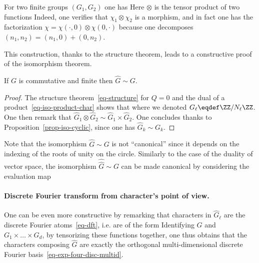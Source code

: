 For two finite groups $(G_1,G_2)$ one has 
Here $\otimes$ is the tensor product of two functions
Indeed, one verifies that $\chi_1 \otimes \chi_2$ is a morphism, and in fact one has the factorization $\chi=\chi(\cdot,0) \otimes \chi(0,\cdot)$ because one decomposes $(n_1,n_2)=(n_1,0)+(0,n_2)$. 

This construction, thanks to the structure theorem, leads to a constructive proof of the isomorphism theorem.

\begin{prop}
	If $G$ is commutative and finite then $\hat G \sim G$.
\end{prop}
\begin{proof}
	The structure theorem~\eqref{eq-structure} for $Q=0$ and the dual of a product~\eqref{eq-iso-product-char} shows that 
	where we denoted $G_\ell \eqdef \ZZ/N_\ell\ZZ$. 
	One then remark that  $\hat G_1 \otimes \hat G_2 \sim \hat G_1 \times \hat G_2$.
	One concludes thanks to Proposition~\ref{prop-iso-cyclic}, since one has $\hat G_k \sim G_k$.
\end{proof}

Note that the isomorphism $\hat G \sim G$ is not ``canonical'' since it depends on the indexing of the roots of unity on the circle. Similarly to the case of the duality of vector space, the isomorphism $\hat{\hat{G}} \sim G$ can be made canonical by considering the evaluation map

\paragraph{Discrete Fourier transform from character's point of view.}

One can be even more constructive by remarking that characters in $\hat G_\ell$ are the discrete Fourier atoms~\eqref{eq-dft}, i.e. are of the form 
Identifying $G$ and $G_1 \times \ldots \times G_d$, 
by tensorizing these functions together, one thus obtains that the characters composing $\hat G$ are exactly the orthogonal multi-dimensional discrete Fourier basis~\eqref{eq-exp-four-disc-multid}.

